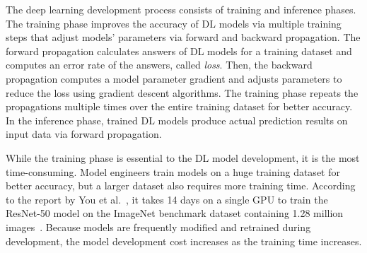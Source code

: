 The deep learning development process consists of training and inference
phases.
The training phase improves the accuracy of DL models via multiple training
steps that adjust models' parameters via forward and backward propagation. 
The forward propagation calculates answers of DL models for a training dataset
and computes an error rate of the answers, called {\it loss}.
Then, the backward propagation computes a model parameter gradient and adjusts
parameters to reduce the loss using gradient descent algorithms.
The training phase repeats the propagations multiple times over the entire
training dataset for better accuracy.
In the inference phase, trained DL models produce actual prediction results on
input data via forward propagation.

While the training phase is essential to the DL model development, it is the
most time-consuming.
Model engineers train models on a huge training dataset for better accuracy,
but a larger dataset also requires more training time.
According to the report by You et al.~\cite{imagenettraining2017}, it takes 14
days on a single GPU to train the ResNet-50 model on the ImageNet benchmark
dataset containing 1.28 million images~\cite{imagenet2014}.
Because models are frequently modified and retrained during development, the
model development cost increases as the training time increases.

